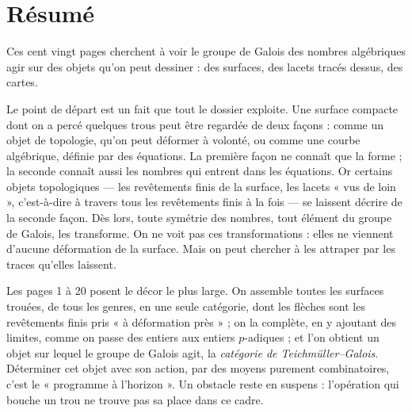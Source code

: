 \documentclass[11pt,a4paper]{article}
\begin{document}
\section*{Résumé}

\begin{resume}
Ces cent vingt pages cherchent à voir le groupe de Galois des nombres
algébriques agir sur des objets qu'on peut dessiner : des surfaces, des
lacets tracés dessus, des cartes.

Le point de départ est un fait que tout le dossier exploite. Une surface
compacte dont on a percé quelques trous peut être regardée de deux façons :
comme un objet de topologie, qu'on peut déformer à volonté, ou comme une
courbe algébrique, définie par des équations. La première façon ne connaît que
la forme ; la seconde connaît aussi les nombres qui entrent dans les
équations. Or certains objets topologiques — les revêtements finis de la
surface, les lacets « vus de loin », c'est-à-dire à travers tous les
revêtements finis à la fois — se laissent décrire de la seconde façon. Dès
lors, toute symétrie des nombres, tout élément du groupe de Galois, les
transforme. On ne voit pas ces transformations : elles ne viennent d'aucune
déformation de la surface. Mais on peut chercher à les attraper par les
traces qu'elles laissent.

Les pages 1 à 20 posent le décor le plus large. On assemble toutes les
surfaces trouées, de tous les genres, en une seule catégorie, dont les flèches
sont les revêtements finis pris « à déformation près » ; on la complète, en y
ajoutant des limites, comme on passe des entiers aux entiers $p$-adiques ; et
l'on obtient un objet sur lequel le groupe de Galois agit, la \emph{catégorie
de Teichmüller–Galois}. Déterminer cet objet avec son action, par des moyens
purement combinatoires, c'est le « programme à l'horizon ». Un obstacle reste
en suspens : l'opération qui bouche un trou ne trouve pas sa place dans ce
cadre.


\end{resume}
\end{document}
